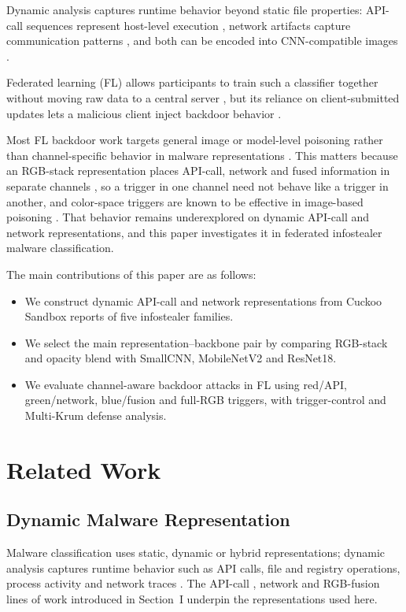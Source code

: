 \documentclass[conference]{IEEEtran}
\begin{document}
Dynamic analysis captures runtime behavior beyond static file properties: API-call sequences represent host-level execution \cite{wu2025mines}, network artifacts capture communication patterns \cite{davis2024traffic}, and both can be encoded into CNN-compatible images \cite{xuan2024rgbfusion}.

Federated learning (FL) allows participants to train such a classifier together without moving raw data to a central server \cite{nobakht2024simfed}, but its reliance on client-submitted updates lets a malicious client inject backdoor behavior \cite{ren2024shadow}.

Most FL backdoor work targets general image or model-level poisoning rather than channel-specific behavior in malware representations \cite{ren2024shadow}. This matters because an RGB-stack representation places API-call, network and fused information in separate channels \cite{xuan2024rgbfusion}, so a trigger in one channel need not behave like a trigger in another, and color-space triggers are known to be effective in image-based poisoning \cite{jiang2023color}. That behavior remains underexplored on dynamic API-call and network representations, and this paper investigates it in federated infostealer malware classification.

The main contributions of this paper are as follows:
\begin{itemize}
    \item We construct dynamic API-call and network representations from Cuckoo Sandbox reports of five infostealer families.
    \item We select the main representation--backbone pair by comparing RGB-stack and opacity blend with SmallCNN, MobileNetV2 and ResNet18.
    \item We evaluate channel-aware backdoor attacks in FL using red/API, green/network, blue/fusion and full-RGB triggers, with trigger-control and Multi-Krum defense analysis.
\end{itemize}

\section{Related Work}

\subsection{Dynamic Malware Representation}

Malware classification uses static, dynamic or hybrid representations; dynamic analysis captures runtime behavior such as API calls, file and registry operations, process activity and network traces \cite{ma2025api}. The API-call \cite{wu2025mines}, network \cite{davis2024traffic} and RGB-fusion \cite{xuan2024rgbfusion} lines of work introduced in Section~I underpin the representations used here.
\end{document}
